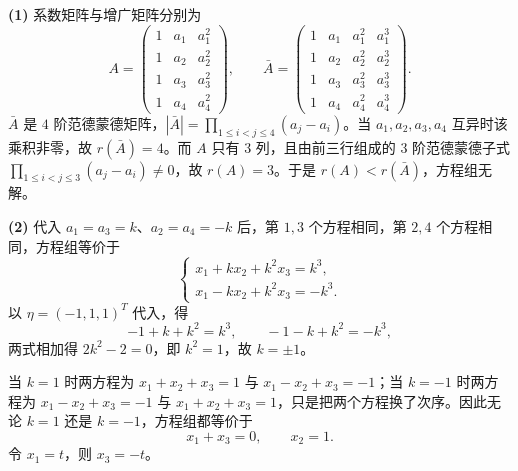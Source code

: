 \begin{solution}
\textbf{(1)} 系数矩阵与增广矩阵分别为
\[
A=\begin{pmatrix}1&a_1&a_1^{2}\\1&a_2&a_2^{2}\\1&a_3&a_3^{2}\\1&a_4&a_4^{2}\end{pmatrix},
\qquad
\bar A=\begin{pmatrix}1&a_1&a_1^{2}&a_1^{3}\\1&a_2&a_2^{2}&a_2^{3}\\1&a_3&a_3^{2}&a_3^{3}\\1&a_4&a_4^{2}&a_4^{3}\end{pmatrix}.
\]
$\bar A$ 是 $4$ 阶范德蒙德矩阵，$|\bar A|=\prod\limits_{1\le i<j\le4}(a_j-a_i)$。当 $a_1,a_2,a_3,a_4$ 互异时该乘积非零，故 $r(\bar A)=4$。而 $A$ 只有 $3$ 列，且由前三行组成的 $3$ 阶范德蒙德子式 $\prod\limits_{1\le i<j\le3}(a_j-a_i)\ne0$，故 $r(A)=3$。于是 $r(A)<r(\bar A)$，方程组无解。

\textbf{(2)} 代入 $a_1=a_3=k$、$a_2=a_4=-k$ 后，第 $1,3$ 个方程相同，第 $2,4$ 个方程相同，方程组等价于
\[
\begin{cases}
x_1+kx_2+k^{2}x_3=k^{3},\\
x_1-kx_2+k^{2}x_3=-k^{3}.
\end{cases}
\]
以 $\eta=(-1,1,1)^{T}$ 代入，得
\[
-1+k+k^{2}=k^{3},\qquad -1-k+k^{2}=-k^{3},
\]
两式相加得 $2k^{2}-2=0$，即 $k^{2}=1$，故 $k=\pm1$。

当 $k=1$ 时两方程为 $x_1+x_2+x_3=1$ 与 $x_1-x_2+x_3=-1$；当 $k=-1$ 时两方程为 $x_1-x_2+x_3=-1$ 与 $x_1+x_2+x_3=1$，只是把两个方程换了次序。因此无论 $k=1$ 还是 $k=-1$，方程组都等价于
\[
x_1+x_3=0,\qquad x_2=1 .
\]
令 $x_1=t$，则 $x_3=-t$。
\end{solution}

